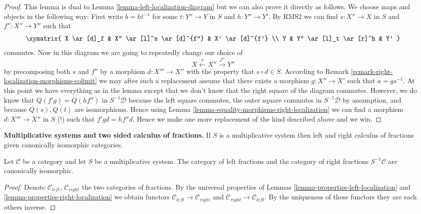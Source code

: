 \begin{proof}
This lemma is dual to
Lemma \ref{lemma-left-localization-diagram}
but we can also prove it directly as follows.
We choose maps and objects in the following way:
First write $b = ht^{-1}$ for some $t : Y'' \to Y$ in $S$ and
$h : Y'' \to Y'$. By RMS2 we can find $s : X'' \to X$ in $S$ and
$f'' : X'' \to Y''$ such that
$$
\xymatrix{
X \ar[d]_f & X'' \ar[l]^s \ar[d]^{f''} & X' \ar[d]^{f'} \\
Y & Y'' \ar[l]_t \ar[r]^h & Y'
}
$$
commutes. Now in this diagram we are going to repeatedly change our
choice of
$$
X \xleftarrow{s} X'' \xrightarrow{f''} Y''
$$
by precomposing
both $s$ and $f''$ by a morphism $d : X''' \to X''$ with the property
that $s \circ d \in S$. According to
Remark \ref{remark-right-localization-morphisms-colimit}
we may after such a replacement assume that there exists a morphism
$g : X'' \to X'$ such that $a = gs^{-1}$. At this point we have everything
as in the lemma except that we don't know that the right square of the
diagram commutes. However, we do know that $Q(f'g) = Q(hf'')$ in
$S^{-1}\mathcal{D}$ because the left square commutes, the outer square commutes
in $S^{-1}\mathcal{D}$ by assumption, and because $Q(s), Q(t)$ are
isomorphisms. Hence using
Lemma \ref{lemma-equality-morphisms-right-localization}
we can find a morphism $d : X''' \to X''$ in $S$ (!) such that
$f'gd = hf''d$. Hence we make one more replacement of the kind described
above and we win.
\end{proof}

\noindent
{\bf Multiplicative systems and two sided calculus of fractions.}
If $S$ is a multiplicative system then left and right calculus of
fractions given canonically isomorphic categories.

\begin{lemma}
\label{lemma-multiplicative-system}
Let $\mathcal{C}$ be a category and let $S$ be a multiplicative system.
The category of left fractions and the category of right fractions
$S^{-1}\mathcal{C}$ are canonically isomorphic.
\end{lemma}

\begin{proof}
Denote $\mathcal{C}_{left}$, $\mathcal{C}_{right}$ the two categories
of fractions. By the universal properties of
Lemmas \ref{lemma-properties-left-localization} and
\ref{lemma-properties-right-localization}
we obtain functors $\mathcal{C}_{left} \to \mathcal{C}_{right}$
and $\mathcal{C}_{right} \to \mathcal{C}_{left}$.
By the uniqueness of these functors they are each others inverse.
\end{proof}


